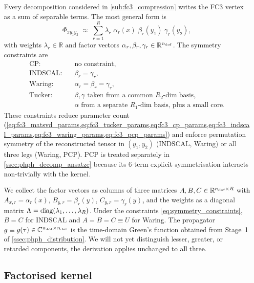 Every decomposition considered in \cref{sub:fc3_compression} writes the FC3 vertex as a sum of
separable terms. The most general form is
\begin{equation}\label{eq:fc3_separable_general}
  \Phi_{x y_1 y_2}
  \;\approx\;
  \sum_{r=1}^{R} \lambda_r\;\alpha_r(x)\;\beta_r(y_1)\;\gamma_r(y_2),
\end{equation}
with weights $\lambda_r\in\mathbb{R}$ and factor vectors
$\alpha_r,\beta_r,\gamma_r\in\mathbb{R}^{n_{\mathrm{dof}}}$. The symmetry constraints are
\begin{equation}\label{eq:symmetry_constraints}
\begin{aligned}
  \text{CP:}      \quad& \text{no constraint,}\\
  \text{INDSCAL:} \quad& \beta_r=\gamma_r,\\
  \text{Waring:}  \quad& \alpha_r=\beta_r=\gamma_r,\\
  \text{Tucker:}  \quad& \text{$\beta,\gamma$ taken from a common $R_2$-dim basis,}\\
                   & \text{$\alpha$ from a separate $R_1$-dim basis, plus a small core.}
\end{aligned}
\end{equation}
These constraints reduce parameter count
(\cref{eq:fc3_matsvd_params,eq:fc3_tucker_params,eq:fc3_cp_params,eq:fc3_indscal_params,eq:fc3_waring_params,eq:fc3_pcp_params})
and enforce permutation symmetry of
the reconstructed tensor in $(y_1,y_2)$ (INDSCAL, Waring) or all
three legs (Waring, PCP). PCP is treated separately in
\cref{ssec:phph_decomp_ansatze} because its $6$-term explicit
symmetrisation interacts non-trivially with the kernel.

We collect the factor vectors as columns of three matrices
$A,B,C \in \mathbb{R}^{n_{\mathrm{dof}}\times R}$ with
$A_{x,r}\!=\!\alpha_r(x)$, $B_{y,r}\!=\!\beta_r(y)$,
$C_{y,r}\!=\!\gamma_r(y)$, and the weights as a diagonal matrix
$\Lambda = \operatorname{diag}(\lambda_1,\dots,\lambda_R)$. Under the constraints
\cref{eq:symmetry_constraints}, $B=C$ for INDSCAL and $A=B=C\equiv U$
for Waring. The propagator
$g\equiv g(\tau)\in\mathbb{C}^{n_{\mathrm{dof}}\times n_{\mathrm{dof}}}$
is the time-domain Green's function obtained from Stage~1 of
\cref{ssec:phph_distribution}. We will not yet distinguish lesser,
greater, or retarded components, the derivation applies unchanged to
all three.

\subsection{Factorised kernel}
\label{ssec:phph_decomp_kernel}


